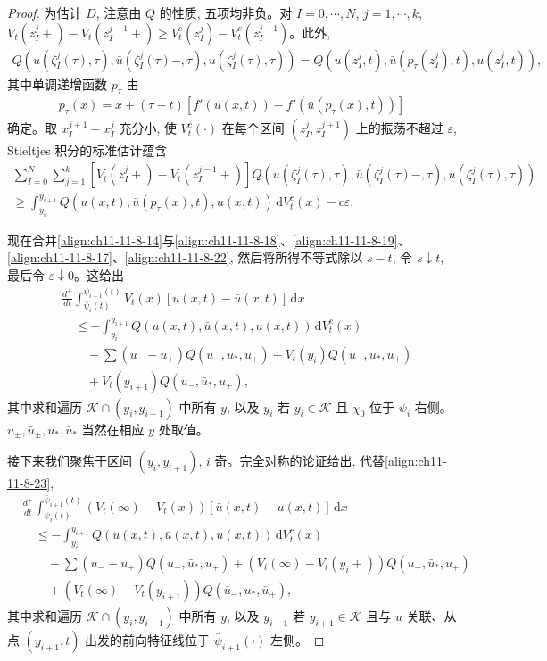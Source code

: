 \documentclass[../../main.tex]{subfiles}
\begin{document}
\begin{proof}
为估计 $D$, 注意由 $Q$ 的性质, 五项均非负。对 $I=0,\cdots,N$, $j=1,\cdots,k$, $V_t(z_I^j+)-V_t(z_I^{j-1}+)\geqslant V_t^c(z_I^j)-V_t^c(z_I^{j-1})$。此外,
\begin{align}
Q(u(\zeta_I^j(\tau),\tau),\bar u(\zeta_I^j(\tau)-,\tau),u(\zeta_I^j(\tau),\tau))=Q(u(z_I^j,t),\bar u(p_\tau(z_I^j),t),u(z_I^j,t)),\label{align:ch11-11-8-20}
\end{align}
其中单调递增函数 $p_\tau$ 由
\begin{align}
p_\tau(x)=x+(\tau-t)[f'(u(x,t))-f'(\bar u(p_\tau(x),t))]\label{align:ch11-11-8-21}
\end{align}
确定。取 $x_I^{j+1}-x_I^j$ 充分小, 使 $V_t^c(\cdot)$ 在每个区间 $(z_I^j,z_I^{j+1})$ 上的振荡不超过 $\varepsilon$, Stieltjes 积分的标准估计蕴含
\begin{align}
\sum_{I=0}^N\sum_{j=1}^k[V_t(z_I^j+)-V_t(z_I^{j-1}+)]Q(u(\zeta_I^j(\tau),\tau),\bar u(\zeta_I^j(\tau)-,\tau),u(\zeta_I^j(\tau),\tau))\nonumber\\
\geqslant\int_{y_i}^{y_{i+1}}Q(u(x,t),\bar u(p_\tau(x),t),u(x,t))\,\mathrm{d}V_t^c(x)-c\varepsilon.\label{align:ch11-11-8-22}
\end{align}

现在合并\eqref{align:ch11-11-8-14}与\eqref{align:ch11-11-8-18}、\eqref{align:ch11-11-8-19}、\eqref{align:ch11-11-8-17}、\eqref{align:ch11-11-8-22}, 然后将所得不等式除以 $s-t$, 令 $s\downarrow t$, 最后令 $\varepsilon\downarrow0$。这给出
\begin{align}
&\frac{d^+}{dt}\int_{\bar\psi_i(t)}^{\psi_{i+1}(t)}V_t(x)[u(x,t)-\bar u(x,t)]\,\mathrm{d}x\nonumber\\
&\quad\leqslant-\int_{y_i}^{y_{i+1}}Q(u(x,t),\bar u(x,t),u(x,t))\,\mathrm{d}V_t^c(x)\nonumber\\
&\qquad-\sum(u_--u_+)Q(u_-,\bar u_*,u_+)+V_t(y_i)Q(\bar u_-,u_*,\bar u_+)\nonumber\\
&\qquad+V_t(y_{i+1})Q(u_-,\bar u_*,u_+),\label{align:ch11-11-8-23}
\end{align}
其中求和遍历 $\mathscr{K}\cap(y_i,y_{i+1})$ 中所有 $y$, 以及 $y_i$ 若 $y_i\in\mathscr{K}$ 且 $\chi_0$ 位于 $\bar\psi_i$ 右侧。$u_\pm,\bar u_\pm,u_*,\bar u_*$ 当然在相应 $y$ 处取值。

接下来我们聚焦于区间 $(y_i,y_{i+1})$, $i$ 奇。完全对称的论证给出, 代替\eqref{align:ch11-11-8-23},
\begin{align}
&\frac{d^+}{dt}\int_{\psi_i(t)}^{\bar\psi_{i+1}(t)}(V_t(\infty)-V_t(x))[\bar u(x,t)-u(x,t)]\,\mathrm{d}x\nonumber\\
&\quad\leqslant-\int_{y_i}^{y_{i+1}}Q(u(x,t),\bar u(x,t),u(x,t))\,\mathrm{d}V_t^c(x)\nonumber\\
&\qquad-\sum(u_--u_+)Q(u_-,\bar u_*,u_+)+(V_t(\infty)-V_t(y_i+))Q(u_-,\bar u_*,u_+)\nonumber\\
&\qquad+(V_t(\infty)-V_t(y_{i+1}))Q(\bar u_-,u_*,\bar u_+),\label{align:ch11-11-8-24}
\end{align}
其中求和遍历 $\mathscr{K}\cap(y_i,y_{i+1})$ 中所有 $y$, 以及 $y_{i+1}$ 若 $y_{i+1}\in\mathscr{K}$ 且与 $u$ 关联、从点 $(y_{i+1},t)$ 出发的前向特征线位于 $\bar\psi_{i+1}(\cdot)$ 左侧。


\end{proof}
\end{document}
